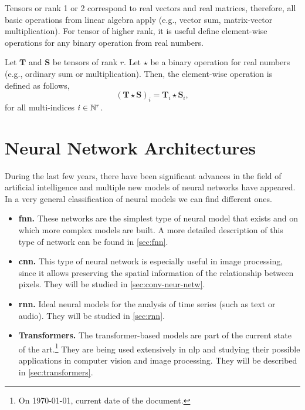 Tensors or rank 1 or 2 correspond to real vectors and real matrices, therefore,
all basic operations from linear algebra apply (e.g., vector sum, matrix-vector
multiplication). For tensor of higher rank, it is useful define element-wise
operations for any binary operation from real numbers.

Let \(\mathbf{T}\) and \(\mathbf{S}\) be tensors of rank \(r\). Let \(\star\)
be a binary operation for real numbers (e.g., ordinary sum or
multiplication). Then, the element-wise operation is defined as follows,
\begin{equation}
  (\mathbf{T} \star \mathbf{S})_i = \mathbf{T}_i \star \mathbf{S}_i,
\end{equation}
for all multi-indices \(i \in \mathbb{N}^r\).



\section{Neural Network Architectures}

During the last few years, there have been significant advances in the field of
artificial intelligence and multiple new models of neural networks have
appeared. In a very general classification of neural models we can find
different ones.

\begin{itemize}
  \item \textbf{\acl{fnn}.} These networks are the simplest type of neural
  model that exists and on which more complex models are built. A more detailed
  description of this type of network can be found in \vref{sec:fnn}.
  \item \textbf{\acl{cnn}.} This type of neural network is especially useful in
  image processing, since it allows preserving the spatial information of the
  relationship between pixels. They will be studied in
  \vref{sec:conv-neur-netw}.
  \item \textbf{\acl{rnn}.} Ideal neural models for the analysis of time series
  (such as text or audio). They will be studied in \vref{sec:rnn}.
  \item \textbf{Transformers.} The transformer-based models are part of the
  current state of the art.\footnote{On \today, current date of the document.}
  They are being used extensively in \gls{nlp} and studying their possible
  applications in computer vision and image processing. They will be described
  in \vref{sec:transformers}.
\end{itemize}



